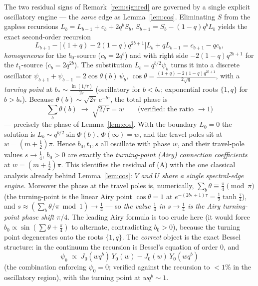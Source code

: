 \begin{remark}\label{rem:wkb}
The two residual signs of Remark~\ref{rem:signred} are governed by a single explicit oscillatory engine
--- the \emph{same} edge as Lemma~\ref{lem:cos}. Eliminating $S$ from the gapless recursions
$L_b=L_{b-1}+c_b+2q^bS_b$, $S_{b+1}=S_b-(1-q)q^bL_b$ yields the exact second-order recursion
\[
   L_{b+1}-\bigl[(1+q)-2(1-q)q^{2b+1}\bigr]L_b+qL_{b-1}=c_{b+1}-qc_b,
\]
\emph{homogeneous} for the $b_0$-source ($c_b=2q^b$) and with right side $-2(1-q)q^{2b+1}$ for the
$t_1$-source ($c_b=2q^{2b}$). The substitution $L_b=q^{b/2}\psi_b$ turns it into a discrete oscillator
$\psi_{b+1}+\psi_{b-1}=2\cos\theta(b)\,\psi_b$, $\cos\theta=\tfrac{(1+q)-2(1-q)q^{2b+1}}{2\sqrt q}$, with a
\emph{turning point} at $b_\ast\sim\tfrac{\ln(1/\tau)}{2\tau}$ (oscillatory for $b<b_\ast$; exponential
roots $\{1,q\}$ for $b>b_\ast$). Because $\theta(b)\sim\sqrt{2\tau}\,e^{-b\tau}$, the total phase is
\[
   \sum_b\theta(b)\;\longrightarrow\;\sqrt{2/\tau}=w \qquad\text{(verified: the ratio $\to1$)}
\]
--- precisely the phase of Lemma~\ref{lem:cos}. With the boundary $L_0=0$ the solution is
$L_b\sim q^{b/2}\sin\Phi(b)$, $\Phi(\infty)=w$, and the travel poles sit at $w=(m+\tfrac12)\pi$. Hence
$b_0,t_1,s$ all oscillate with phase $w$, and their travel-pole values $s\to\tfrac14$, $b_0>0$ are exactly
the \emph{turning-point (Airy) connection coefficients} at $w=(m+\tfrac12)\pi$. This identifies the residual
of (A) with the one classical analysis already behind Lemma~\ref{lem:cos}: \emph{$V$ and $U$ share a single
spectral-edge engine.} Moreover the phase at the travel poles is, numerically, $\sum_b\theta\equiv\tfrac\pi4
\pmod\pi$ (the turning-point is the linear Airy point $\cos\theta=1$ at $e^{-(2b_\ast+1)\tau}=\tfrac12\tanh
\tfrac\tau4$), and $s\approx(\sum_b\theta/\pi\bmod1)\to\tfrac14$ --- so \emph{the value $\tfrac14$ in
$s\to\tfrac14$ is the Airy turning-point phase shift $\pi/4$}. The leading Airy formula is too crude here (it would force $b_0\propto\sin(\sum\theta+\tfrac\pi4)$ to
alternate, contradicting $b_0>0$), because the turning point degenerates onto the roots $\{1,q\}$. The
\emph{correct} object is the exact Bessel structure: in the continuum the recursion is Bessel's equation of
order $0$, and
\[
   \psi_b\;\propto\;J_0(wq^b)\,Y_0(w)-J_0(w)\,Y_0(wq^b)
\]
(the combination enforcing $\psi_0=0$; verified against the recursion to $<1\%$ in the oscillatory region),
with the turning point at $wq^b\sim1$.


\end{remark}
